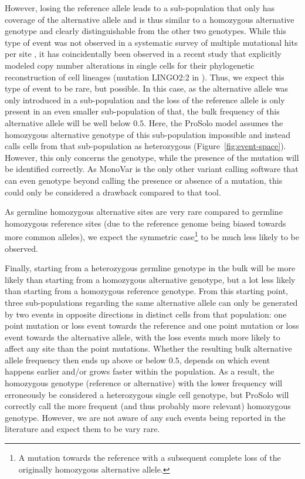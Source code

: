 \documentclass[authoryear,preprint,11pt]{scrartcl}
\begin{document}
However, losing the reference allele leads to a sub-population that only has coverage of the alternative allele and is thus similar to a homozygous alternative genotype and clearly distinguishable from the other two genotypes.
While this type of event was not observed in a systematic survey of multiple mutational hits per site \citep{kuipers_single-cell_2017}, it has coincidentally been observed in a recent study that explicitly modeled copy number alterations in single cells for their phylogenetic reconstruction of cell lineages (mutation LINGO2:2 in \cite{satas_scarlet_2020}).
Thus, we expect this type of event to be rare, but possible.
In this case, as the alternative allele was only introduced in a sub-population and the loss of the reference allele is only present in an even smaller sub-population of that, the bulk frequency of this alternative allele will be well below $0.5$.
Here, the ProSolo model assumes the homozygous alternative genotype of this sub-population impossible and instead calls cells from that sub-population as heterozygous (Figure~\ref{fig:event-space}).
However, this only concerns the genotype, while the presence of the mutation will be identified correctly.
As MonoVar is the only other variant calling software that can even genotype beyond calling the presence or absence of a mutation, this could only be considered a drawback compared to that tool.

As germline homozygous alternative sites are very rare compared to germline homozygous reference sites (due to the reference genome being biased towards more common alleles), we expect the symmetric case\footnote{A mutation towards the reference with a subsequent complete loss of the originally homozygous alternative allele.} to be much less likely to be observed.

Finally, starting from a heterozygous germline genotype in the bulk will be more likely than starting from a homozygous alternative genotype, but a lot less likely than starting from a homozygous reference genotype.
From this starting point, three sub-populations regarding the same alternative allele can only be generated by two events in opposite directions in distinct cells from that population:
one point mutation or loss event towards the reference and one point mutation or loss event towards the alternative allele, with the loss events much more likely to affect any site than the point mutations.
Whether the resulting bulk alternative allele frequency then ends up above or below $0.5$, depends on which event happens earlier and/or grows faster within the population.
As a result, the homozygous genotype (reference or alternative) with the lower frequency will erroneously be considered a heterozygous single cell genotype, but ProSolo will correctly call the more frequent (and thus probably more relevant) homozygous genotype.
However, we are not aware of any such events being reported in the literature and expect them to be vary rare.
\end{document}
